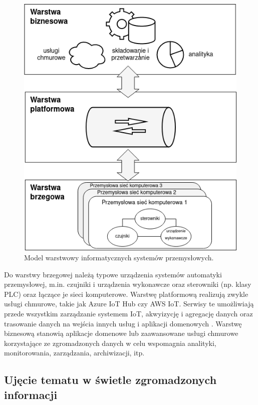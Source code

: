 \documentclass[a4paper, 12pt, twoside]{article}
\begin{document}
\begin{figure}[H]
    \centering
    \includegraphics[scale=0.50]{iiot_arch.png}
    \caption{Model warstwowy informatycznych systemów przemysłowych.}
    \label{fig:iiot-arch}
\end{figure}

Do warstwy brzegowej należą
typowe urządzenia systemów automatyki przemysłowej, m.in. czujniki i urządzenia wykonawcze oraz
sterowniki (np. klasy PLC) oraz łączące je sieci komputerowe. Warstwę platformową realizują
zwykle usługi chmurowe, takie jak Azure IoT Hub czy AWS IoT. Serwisy te umożliwiają przede wszystkim zarządzanie
systemem IoT, akwyizycję i agregację danych oraz trasowanie danych na wejścia
innych usług i aplikacji domenowych \cite{models-innovative-iot}. Warstwę biznesową
stanowią aplikacje domenowe lub zaawansowane usługi chmurowe
korzystające ze zgromadzonych danych w celu wspomagnia
analityki, monitorowania, zarządzania, archiwizacji, itp.

\subsection{Ujęcie tematu w świetle zgromadzonych informacji}
\end{document}
